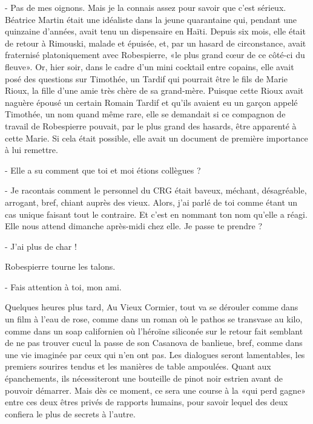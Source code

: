 - Pas de mes oignons. Mais je la connais assez pour savoir que c’est sérieux.
Béatrice Martin était une idéaliste dans la jeune quarantaine qui, pendant une quinzaine d’années, avait tenu un dispensaire en Haïti. Depuis six mois, elle était de retour à Rimouski, malade et épuisée, et, par un hasard de circonstance, avait fraternisé platoniquement avec Robespierre, «le plus grand cœur de ce côté-ci du fleuve». Or, hier soir, dans le cadre d’un mini cocktail entre copains, elle avait posé des questions sur Timothée, un Tardif qui pourrait être le fils de Marie Rioux, la fille d’une amie très chère de sa grand-mère. Puisque cette Rioux avait naguère épousé un certain Romain Tardif et qu’ils avaient eu un garçon appelé Timothée, un nom quand même rare, elle se demandait si ce compagnon de travail de Robespierre pouvait, par le plus grand des hasards, être apparenté à cette Marie. Si cela était possible, elle avait un document de première importance à lui remettre.

- Elle a su comment que toi et moi étions collègues ?

- Je racontais comment le personnel du CRG était baveux, méchant, désagréable, arrogant, bref, chiant auprès des vieux. Alors, j’ai parlé de toi comme étant un cas unique faisant tout le contraire. Et c’est en nommant ton nom qu’elle a réagi. Elle nous attend dimanche après-midi chez elle. Je passe te prendre ?

- J’ai plus de char !

Robespierre tourne les talons.

- Fais attention à toi, mon ami.

Quelques heures plus tard, Au Vieux Cormier, tout va se dérouler comme dans un film à l’eau de rose, comme dans un roman où le pathos se transvase au kilo, comme dans un soap californien où l’héroïne siliconée sur le retour fait semblant de ne pas trouver cucul la passe de son Casanova de banlieue, bref, comme dans une vie imaginée par ceux qui n’en ont pas. Les dialogues seront lamentables, les premiers sourires tendus et les manières de table ampoulées. Quant aux épanchements, ils nécessiteront une bouteille de pinot noir estrien avant de pouvoir démarrer. Mais dès ce moment, ce sera une course à la «qui perd gagne» entre ces deux êtres privés de rapports humains, pour savoir lequel des deux confiera le plus de secrets à l’autre.

